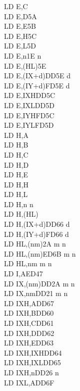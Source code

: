\begin{multicols}{3}
{\begin{tabbing}
        LD E,C\\
        LD E,D\>5A\\
        LD E,E\>5B\\
        LD E,H\>5C\\
        LD E,L\>5D\\
        LD E,n\>1E n\\
        LD E,(HL)\>5E\\
        LD E,(IX+d)\>DD5E d\\
        LD E,(IY+d)\>FD5E d\\
        LD E,IXH\UNDOC\>DD5C\\
        LD E,IXL\UNDOC\>DD5D\\
        LD E,IYH\UNDOC\>FD5C\\
        LD E,IYL\UNDOC\>FD5D\\
        LD H,A\\
        LD H,B\\
        LD H,C\\
        LD H,D\\
        LD H,E\\
        LD H,H\\
        LD H,L\\
        LD H,n n\\
        LD H,(HL)\\
        LD H,(IX+d)\>DD66 d\\
        LD H,(IY+d)\>FD66 d\\
        LD HL,(nm)\>2A m n\\
        LD HL,(nm)\>ED6B m n\\
        LD HL,nm m n\\
        LD I,A\>ED47\\
        LD IX,(nm)\>DD2A m n\\
        LD IX,nm\>DD21 m n\\
        LD IXH,A\UNDOC\>DD67\\
        LD IXH,B\UNDOC\>DD60\\
        LD IXH,C\UNDOC\>DD61\\
        LD IXH,D\UNDOC\>DD62\\
        LD IXH,E\UNDOC\>DD63\\
        LD IXH,IXH\UNDOC\>DD64\\
        LD IXH,IXL\UNDOC\>DD65\\
        LD IXH,n\UNDOC\>DD26 n \\
        LD IXL,A\UNDOC\>DD6F\\

\end{tabbing}}
\end{multicols}
